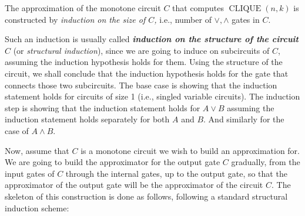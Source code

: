 The approximation of the  monotone circuit $C$ that computes $\operatorname{CLIQUE}(n, k)$ is constructed  by\emph{ induction on the size of $C$,} i.e., number of $\lor, \wedge$ gates in $C$.


\begin{tcolorbox}[colframe=white, colback=gray!11, boxrule=0mm, sharp corners]
\begin{note} Such an induction is usually called \emph{\textbf{induction on the structure of the circuit} $C$} (or \emph{structural induction}), since we are going to induce on subcircuits of $C$, assuming the induction hypothesis holds for them. Using the structure of the circuit, we shall conclude that the induction hypothesis  holds for the gate that connects those two subcircuits. The base case is showing that the induction statement holds for circuits of size 1 (i.e., singled variable circuits). The induction step is showing that the induction statement holds for $A\lor B$ assuming the induction statement holds separately for both $A$ and $B$. And similarly for the case of $A\land B$.     
\end{note}
\end{tcolorbox}

 

Now, assume that $C$ is a monotone circuit we wish to build an approximation for. We are going to build the approximator for the output gate $C$ gradually, from the input gates of $C$  through the internal gates, up to the output gate, so that the approximator of the output gate will be the approximator of the circuit $C$. The skeleton of this construction is done as follows, following a standard structural induction scheme:


\newcommand{\gapx}{\ensuremath{{\rm approx}}}

